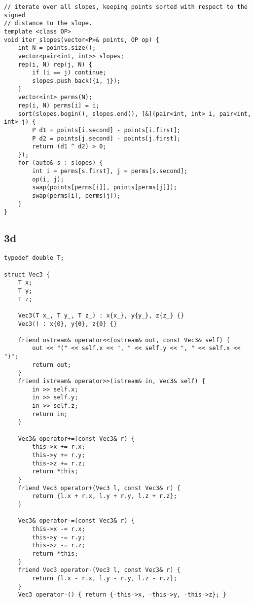 \documentclass[twoside]{article}
\begin{document}
\begin{multicols*}{2}
\begin{verbatim}
// iterate over all slopes, keeping points sorted with respect to the signed
// distance to the slope.
template <class OP>
void iter_slopes(vector<P>& points, OP op) {
    int N = points.size();
    vector<pair<int, int>> slopes;
    rep(i, N) rep(j, N) {
        if (i == j) continue;
        slopes.push_back({i, j});
    }
    vector<int> perms(N);
    rep(i, N) perms[i] = i;
    sort(slopes.begin(), slopes.end(), [&](pair<int, int> i, pair<int, int> j) {
        P d1 = points[i.second] - points[i.first];
        P d2 = points[j.second] - points[j.first];
        return (d1 ^ d2) > 0;
    });
    for (auto& s : slopes) {
        int i = perms[s.first], j = perms[s.second];
        op(i, j);
        swap(points[perms[i]], points[perms[j]]);
        swap(perms[i], perms[j]);
    }
}
\end{verbatim}

{
\subsection*{3d}
}
\begin{verbatim}
typedef double T;

struct Vec3 {
    T x;
    T y;
    T z;

    Vec3(T x_, T y_, T z_) : x{x_}, y{y_}, z{z_} {}
    Vec3() : x{0}, y{0}, z{0} {}

    friend ostream& operator<<(ostream& out, const Vec3& self) {
        out << "(" << self.x << ", " << self.y << ", " << self.x << ")";
        return out;
    }
    friend istream& operator>>(istream& in, Vec3& self) {
        in >> self.x;
        in >> self.y;
        in >> self.z;
        return in;
    }

    Vec3& operator+=(const Vec3& r) {
        this->x += r.x;
        this->y += r.y;
        this->z += r.z;
        return *this;
    }
    friend Vec3 operator+(Vec3 l, const Vec3& r) {
        return {l.x + r.x, l.y + r.y, l.z + r.z};
    }

    Vec3& operator-=(const Vec3& r) {
        this->x -= r.x;
        this->y -= r.y;
        this->z -= r.z;
        return *this;
    }
    friend Vec3 operator-(Vec3 l, const Vec3& r) {
        return {l.x - r.x, l.y - r.y, l.z - r.z};
    }
    Vec3 operator-() { return {-this->x, -this->y, -this->z}; }


\end{verbatim}
\end{multicols*}
\end{document}
